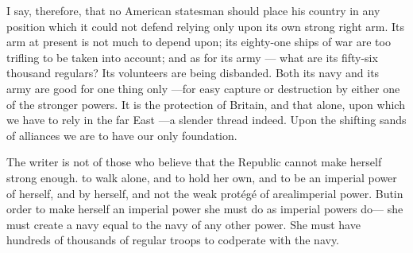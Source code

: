 \documentclass[11pt,openany]{book}
\begin{document}
I say, therefore, that no American statesman should place his country in any position which it could not defend relying only upon its own strong right arm. Its arm at present is not much to depend upon; its eighty-one ships of war are too trifling to be taken into account; and as for its army --- what are its fifty-six thousand regulars? Its volunteers are being disbanded. Both its navy and its army are good for one thing only ---for easy capture or destruction by either one of the stronger powers. It is the protection of Britain, and that alone, upon which we have to rely in the far East ---a slender thread indeed. Upon the shifting sands of alliances we are to have our only foundation.

The writer is not of those who believe that the Republic cannot make herself strong enough. to walk alone, and to hold her own, and to be an imperial power of herself, and by herself, and not the weak protégé of arealimperial power. Butin order to make herself an imperial power she must do as imperial powers do--- she must create a navy equal to the navy of any other power. She must have hundreds of thousands of regular troops to codperate with the navy.
\end{document}
